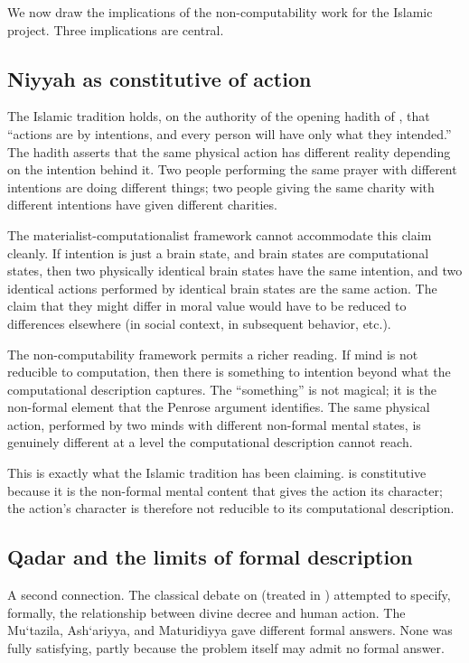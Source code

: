 We now draw the implications of the non-computability work for the
Islamic project. Three implications are central.

\subsection{Niyyah as constitutive of action}

The Islamic tradition holds, on the authority of the opening hadith
of , that ``actions are by intentions, and
every person will have only what they intended.'' The hadith
asserts that the same physical action has different reality
depending on the intention behind it. Two people performing the same
prayer with different intentions are doing different things; two
people giving the same charity with different intentions have given
different charities.

The materialist-computationalist framework cannot accommodate this
claim cleanly. If intention is just a brain state, and brain states
are computational states, then two physically identical brain
states have the same intention, and two identical actions performed
by identical brain states are the same action. The claim that they
might differ in moral value would have to be reduced to differences
elsewhere (in social context, in subsequent behavior, etc.).

The non-computability framework permits a richer reading. If mind
is not reducible to computation, then there is something to
intention beyond what the computational description captures. The
``something'' is not magical; it is the non-formal element that the
Penrose argument identifies. The same physical action, performed by
two minds with different non-formal mental states, is genuinely
different at a level the computational description cannot reach.

This is exactly what the Islamic tradition has been claiming.
 is constitutive because it is the non-formal mental
content that gives the action its character; the action's character
is therefore not reducible to its computational description.

\subsection{Qadar and the limits of formal description}

A second connection. The classical  debate on 
(treated in ) attempted to specify, formally, the
relationship between divine decree and human action. The Mu`tazila,
Ash`ariyya, and Maturidiyya gave different formal answers. None was
fully satisfying, partly because the problem itself may admit no
formal answer.

